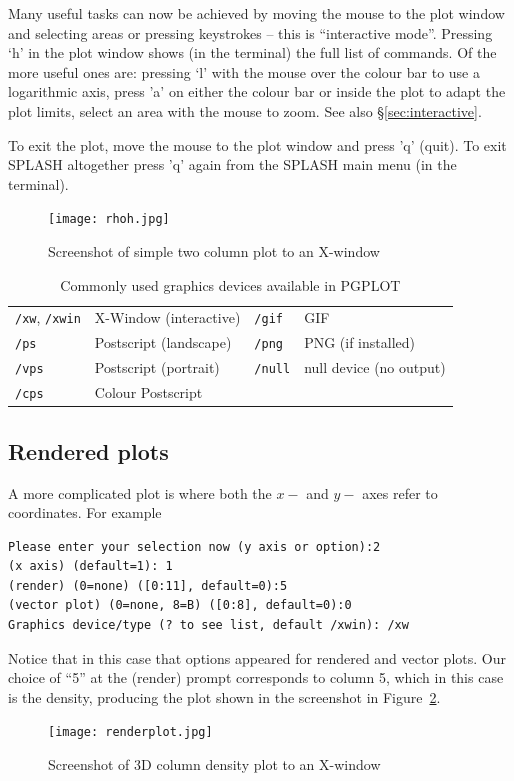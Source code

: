 \documentclass[a4paper,10pt]{article}
\newcommand{\splash}{\textsc{SPLASH }}
\begin{document}
 Many useful tasks can now be achieved by moving the mouse to the plot window and selecting areas or pressing keystrokes -- this is ``interactive mode''. Pressing `h' in the plot window shows (in the terminal) the full list of commands. Of the more useful ones are: pressing `l' with the mouse over the colour bar to use a logarithmic axis, press 'a' on either the colour bar or inside the plot to adapt the plot limits, select an area with the mouse to zoom. See also \S\ref{sec:interactive}.

To exit the plot, move the mouse to the plot window and press 'q' (quit). To exit \splash altogether press 'q' again from the \splash main menu (in the terminal). 
\begin{figure}[ht]
\begin{center}
\texttt{[image: rhoh.jpg]}
\caption{Screenshot of simple two column plot to an X-window}
\label{fig:rhoh}
\end{center}
\end{figure}

\begin{table}[h]
\centering
\begin{tabular}{|l|l|l|l|}
\hline
\verb+/xw+, \verb+/xwin+ & X-Window (interactive) & \verb+/gif+ & GIF \\
\verb+/ps+ & Postscript (landscape) & \verb+/png+ & PNG (if installed) \\
\verb+/vps+ & Postscript (portrait) & \verb+/null+ & null device (no output) \\
\verb+/cps+ & Colour Postscript & & \\
\hline
\end{tabular}
\caption{Commonly used graphics devices available in PGPLOT}
\label{tab:devices}
\end{table}

\subsection{Rendered plots}
\label{sec:renderplot}
A more complicated plot is where both the $x-$ and $y-$ axes refer to coordinates. For example
\begin{verbatim}
Please enter your selection now (y axis or option):2
(x axis) (default=1): 1
(render) (0=none) ([0:11], default=0):5
(vector plot) (0=none, 8=B) ([0:8], default=0):0
Graphics device/type (? to see list, default /xwin): /xw
\end{verbatim}
Notice that in this case that options appeared for rendered and vector plots. Our choice of ``5'' at the (render) prompt corresponds to column 5, which in this case is the density, producing the plot shown in the screenshot in Figure~\ref{fig:renderplot}.
\begin{figure}[h]
\begin{center}
\texttt{[image: renderplot.jpg]}
\caption{Screenshot of 3D column density plot to an X-window}
\label{fig:renderplot}
\end{center}
\end{figure}
\end{document}
